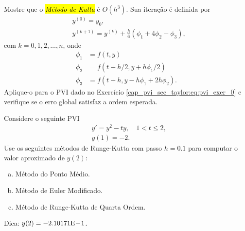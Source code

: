 \begin{exer}
  Mostre que o \hl{\emph{Método de Kutta}} é $O(h^3)$. Sua iteração é definida por
  \begin{equation}
    \begin{aligned}
      &y^{(0)} = y_0,\\
      &y^{(k+1)} = y^{(k)} + \frac{h}{6}\left(\phi_1 + 4\phi_2 + \phi_3\right),
    \end{aligned}
  \end{equation}
  com $k = 0, 1, 2, \dotsc, n$, onde
  \begin{equation}
    \begin{aligned}
      \phi_1 &= f(t, y)\\
      \phi_2 &= f(t + h/2, y + h\phi_1/2)\\
      \phi_3 &= f(t + h, y - h\phi_1 + 2h\phi_2).
    \end{aligned}
  \end{equation}
  Aplique-o para o PVI dado no Exercício \eqref{cap_pvi_sec_taylor:eq:pvi_exer_0} e verifique se o erro global satisfaz a ordem esperada.
\end{exer}

\begin{exer}
  Considere o seguinte PVI
  \begin{subequations}
    \begin{align}
      &y' = y^2 - ty,\quad 1 < t \leq 2,\\
      &y(1) = -2.
    \end{align}
  \end{subequations}
  Use os seguintes métodos de Runge-Kutta com passo $h=0.1$ para computar o valor aproximado de $y(2)$:
  \begin{enumerate}[a)]
  \item Método do Ponto Médio.
  \item Método de Euler Modificado.
  \item Método de Runge-Kutta de Quarta Ordem.
  \end{enumerate}
\end{exer}
\begin{resp}
  Dica: $y(2) = -2.10171\mathrm{E}\!-\!1$.
\end{resp}

